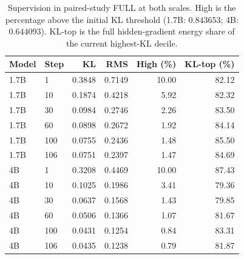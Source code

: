 \begin{table}[!htbp]
\centering
\caption{Supervision in paired-study FULL at both scales. High is the percentage above the initial KL threshold (1.7B: $0.843653$; 4B: $0.644093$). KL-top is the full hidden-gradient energy share of the current highest-KL decile.}
\label{tab:two_scale_signal}
\small
\setlength{\tabcolsep}{3pt}
\begin{tabular}{llrrrr}
\toprule
Model & Step & KL & RMS & High (\%) & KL-top (\%) \\
\midrule
1.7B & 1 & 0.3848 & 0.7149 & 10.00 & 82.12 \\
1.7B & 10 & 0.1874 & 0.4218 & 5.92 & 82.32 \\
1.7B & 30 & 0.0984 & 0.2746 & 2.26 & 83.50 \\
1.7B & 60 & 0.0898 & 0.2672 & 1.92 & 84.14 \\
1.7B & 100 & 0.0755 & 0.2436 & 1.48 & 85.50 \\
1.7B & 106 & 0.0751 & 0.2397 & 1.47 & 84.69 \\
4B & 1 & 0.3208 & 0.4469 & 10.00 & 87.43 \\
4B & 10 & 0.1025 & 0.1986 & 3.41 & 79.36 \\
4B & 30 & 0.0637 & 0.1568 & 1.43 & 79.85 \\
4B & 60 & 0.0506 & 0.1366 & 1.07 & 81.67 \\
4B & 100 & 0.0431 & 0.1254 & 0.84 & 83.31 \\
4B & 106 & 0.0435 & 0.1238 & 0.79 & 81.87 \\
\bottomrule
\end{tabular}
\end{table}
